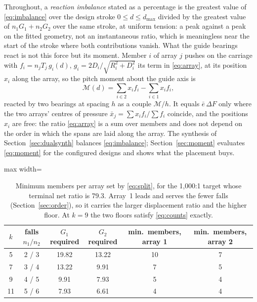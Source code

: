 \documentclass[preprint,12pt,number]{elsarticle}
\newcommand{\dmax}{d_{\max}}
\begin{document}
Throughout, a \emph{reaction imbalance} stated as a percentage is the greatest value of \eqref{eq:imbalance} over the design stroke $0 \le d \le \dmax$ divided by the greatest value of $n_1 G_1 + n_2 G_2$ over the same stroke, at uniform tension: a peak against a peak on the fitted geometry, not an instantaneous ratio, which is meaningless near the start of the stroke where both contributions vanish. What the guide bearings react is not this force but its moment. Member $i$ of array $j$ pushes on the carriage with $f_i = n_j T_j\, g_i(d)$, $g_i = 2D_i/\sqrt{R_i^2 + D_i^2}$ its term in \eqref{eq:array}, at its position $x_i$ along the array, so the pitch moment about the guide axis is
\begin{equation}
\mathcal{M}(d) = \sum_{i \in 2} x_i f_i - \sum_{i \in 1} x_i f_i,
\label{eq:moment}
\end{equation}
reacted by two bearings at spacing $h$ as a couple $\mathcal{M}/h$. It equals $\bar{e}\,\Delta F$ only where the two arrays' centres of pressure $\bar{x}_j = \sum x_i f_i / \sum f_i$ coincide, and the positions $x_i$ are free: the ratio \eqref{eq:array} is a sum over members and does not depend on the order in which the spans are laid along the array. The synthesis of Section~\ref{sec:dualsynth} balances \eqref{eq:imbalance}; Section~\ref{sec:moment} evaluates \eqref{eq:moment} for the configured designs and shows what the placement buys.

\begin{table}[H]
\centering
\caption{Minimum members per array set by \eqref{eq:split}, for the 1,000:1 target whose terminal net ratio is 79.3. Array~1 leads and serves the fewer falls (Section~\ref{sec:order}), so it carries the larger displacement ratio and the higher floor. At $k=9$ the two floors satisfy \eqref{eq:counts} exactly.}
\label{tab:floors}
\begin{adjustbox}{max width=\linewidth}
\begin{tabular}{cccccc}
\toprule
$k$ & falls $n_1/n_2$ & $G_1$ required & $G_2$ required & min.\ members, array 1 & min.\ members, array 2 \\
\midrule
5  & 2 / 3 & 19.82 & 13.22 & 10 & 7 \\
7  & 3 / 4 & 13.22 & 9.91  & 7  & 5 \\
9  & 4 / 5 & 9.91  & 7.93  & 5  & 4 \\
11 & 5 / 6 & 7.93  & 6.61  & 4  & 4 \\
\bottomrule
\end{tabular}
\end{adjustbox}
\end{table}
\end{document}
